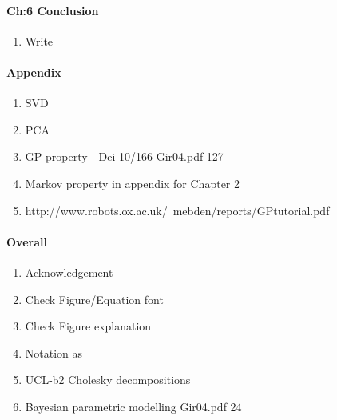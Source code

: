 \documentclass[a4paper,10pt]{article}
\begin{document}
\paragraph{Ch:6 Conclusion}
\begin{enumerate}
 \item Write
\end{enumerate}

\paragraph{Appendix}
\begin{enumerate}
 \item SVD
 \item PCA
 \item GP property - Dei 10/166  Gir04.pdf 127
 \item Markov property in appendix for Chapter 2
 \item http://www.robots.ox.ac.uk/~mebden/reports/GPtutorial.pdf
\end{enumerate}

\paragraph{Overall}
\begin{enumerate}
 \item Acknowledgement 
 \item Check Figure/Equation font
 \item Check Figure explanation
 \item Notation as %
 \item UCL-b2 Cholesky decompositions
 \item Bayesian parametric modelling Gir04.pdf 24
 
\end{enumerate}
\end{document}
